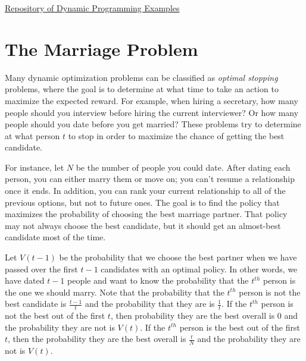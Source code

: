 
\href{https://github.com/TheAlgorithms/Python/tree/master/dynamic_programming}{Repository of Dynamic Programming Examples}


\section*{The Marriage Problem} %

Many dynamic optimization problems can be classified as \emph{optimal stopping} problems, where the goal is to determine at what time to take an action to maximize the expected reward.
For example, when hiring a secretary, how many people should you interview before hiring the current interviewer?
Or how many people should you date before you get married?
These problems try to determine at what person $t$ to stop in order to maximize the chance of getting the best candidate.

For instance, let $N$ be the number of people you could date.
After dating each person, you can either marry them or move on; you can't resume a relationship once it ends.
In addition, you can rank your current relationship to all of the previous options, but not to future ones.
The goal is to find the policy that maximizes the probability of choosing the best marriage partner.
That policy may not always choose the best candidate, but it should get an almost-best candidate most of the time.

Let $V(t-1)$ be the probability that we choose the best partner when we have passed over the first $t-1$ candidates with an optimal policy.
In other words, we have dated $t-1$ people and want to know the probability that the $t^{th}$ person is the one we should marry.
Note that the probability that the $t^{th}$ person is not the best candidate is $\frac{t-1}{t}$ and the probability that they are is $\frac{1}{t}$.
If the $t^{th}$ person is not the best out of the first $t$, then probability they are the best overall is 0 and the probability they are not is $V(t)$.
If the $t^{th}$ person is the best out of the first $t$, then the probability they are the best overall is $\frac{t}{N}$ and the probability they are not is $V(t)$.

